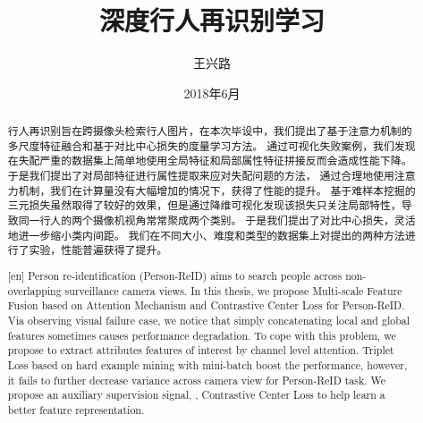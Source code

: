 \documentclass[fangfont=AdobeFangsongStd-Regular,heifont=AdobeHeitiStd-Regular]{zju-thesis}
\title{深度行人再识别学习}{浙江大学本科生毕业论文}
\author{王兴路}{3140102282}
\date{2018年6月}
\begin{document}

\begin{abstract}
	行人再识别旨在跨摄像头检索行人图片，在本次毕设中，我们提出了基于注意力机制的多尺度特征融合和基于对比中心损失的度量学习方法。
	通过可视化失败案例，我们发现在失配严重的数据集上简单地使用全局特征和局部属性特征拼接反而会造成性能下降。
	于是我们提出了对局部特征进行属性提取来应对失配问题的方法，
	通过合理地使用注意力机制，我们在计算量没有大幅增加的情况下，获得了性能的提升。
	基于难样本挖掘的三元损失虽然取得了较好的效果，但是通过降维可视化发现该损失只关注局部特性，导致同一行人的两个摄像机视角常常聚成两个类别。
	于是我们提出了对比中心损失，灵活地进一步缩小类内间距。
	我们在不同大小、难度和类型的数据集上对提出的两种方法进行了实验，性能普遍获得了提升。

	\end{abstract}
\begin{abstract}[en]
	Person re-identification (Person-ReID) aims to search people across non-overlapping surveillance camera views. In this thesis, we propose Multi-scale Feature Fusion based on Attention Mechanism and Contrastive Center Loss for Person-ReID. 
	Via observing visual failure case, we notice that simply concatenating local and global features sometimes causes performance degradation. To cope with this problem, we propose to extract attributes features of interest by channel level attention. 
	Triplet Loss based on hard example mining with mini-batch boost the performance, however, it fails to further decrease variance across camera view for Person-ReID task. We propose an auxiliary supervision signal, \ie, Contrastive Center Loss to help learn a better feature representation.
	
\end{abstract}
	
\end{document}
